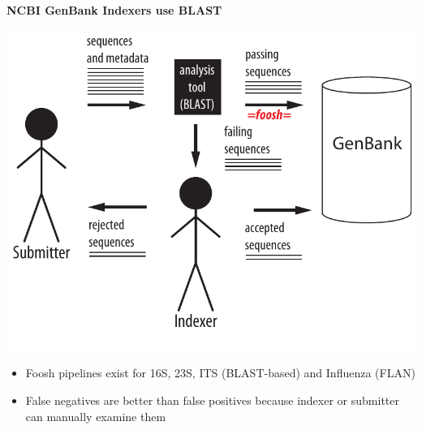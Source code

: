 \documentclass[landscape]{slides}
\begin{document}
\begin{slide}
\begin{center}
\textbf{NCBI GenBank Indexers use BLAST}

\includegraphics[width=7in]{figs/submission-schematic-2}

\small
\begin{itemize}
\item Foosh pipelines exist for 16S, 23S, ITS (BLAST-based) and
    Influenza (FLAN)
\item False negatives are better than false positives because indexer or submitter can manually examine them
\end{itemize}

\vfill
\end{center}
\end{slide}
%
%
%
\end{document}
